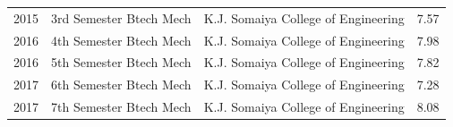 \documentclass[letterpaper,11pt]{article}
\begin{document}
\begin{table}[h!]
\begin{center}
\begin{tabular}{l|c|r|l}
			2015 & \hspace{0.2cm} 3rd Semester Btech Mech \hspace{0.2cm} & \hspace{0.2cm}K.J. Somaiya College of Engineering\hspace{0.2cm} & \hspace{1.2cm} 7.57 \hspace{0.2cm}\\
			2016 & \hspace{0.2cm} 4th Semester Btech Mech \hspace{0.2cm} & \hspace{0.2cm}K.J. Somaiya College of Engineering\hspace{0.2cm} & \hspace{1.2cm} 7.98 \hspace{0.2cm}\\
			2016 & \hspace{0.2cm} 5th Semester Btech Mech \hspace{0.2cm} & \hspace{0.2cm}K.J. Somaiya College of Engineering\hspace{0.2cm} & \hspace{1.2cm} 7.82 \hspace{0.2cm}\\
			2017 & \hspace{0.2cm} 6th Semester Btech Mech \hspace{0.2cm} & \hspace{0.2cm}K.J. Somaiya College of Engineering\hspace{0.2cm} & \hspace{1.2cm} 7.28 \hspace{0.2cm}\\
			2017 & \hspace{0.2cm} 7th Semester Btech Mech \hspace{0.2cm} & \hspace{0.2cm}K.J. Somaiya College of Engineering\hspace{0.2cm} & \hspace{1.2cm} 8.08 \hspace{0.2cm}\\
			
		\end{tabular}
	\end{center}
\end{table}
\textbf{}  \\
\textbf{}  \\
\end{document}
